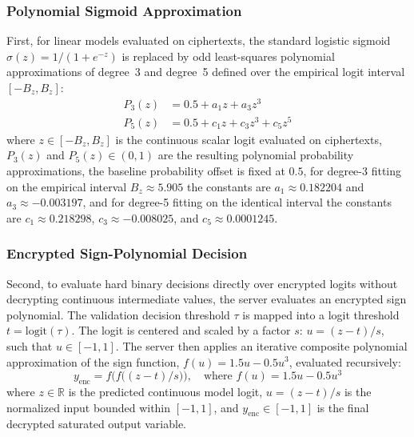 \documentclass[conference]{IEEEtran}
\begin{document}
\subsubsection{Polynomial Sigmoid Approximation}
First, for linear models evaluated on ciphertexts, the standard logistic sigmoid $\sigma(z) = 1/(1 + e^{-z})$ is replaced by odd least-squares polynomial approximations of degree~3 and degree~5 defined over the empirical logit interval $[-B_z, B_z]$:
\begin{equation}
\begin{aligned}
P_3(z) &= 0.5 + a_1 z + a_3 z^3 \\
P_5(z) &= 0.5 + c_1 z + c_3 z^3 + c_5 z^5
\end{aligned}
\label{eq:polysig}
\end{equation}
where $z \in [-B_z, B_z]$ is the continuous scalar logit evaluated on ciphertexts, $P_3(z)$ and $P_5(z) \in (0, 1)$ are the resulting polynomial probability approximations, the baseline probability offset is fixed at $0.5$, for degree-3 fitting on the empirical interval $B_z \approx 5.905$ the constants are $a_1 \approx 0.182204$ and $a_3 \approx -0.003197$, and for degree-5 fitting on the identical interval the constants are $c_1 \approx 0.218298$, $c_3 \approx -0.008025$, and $c_5 \approx 0.0001245$.

\subsubsection{Encrypted Sign-Polynomial Decision}
Second, to evaluate hard binary decisions directly over encrypted logits without decrypting continuous intermediate values, the server evaluates an encrypted sign polynomial. The validation decision threshold $\tau$ is mapped into a logit threshold $t = \mathrm{logit}(\tau)$. The logit is centered and scaled by a factor $s$: $u = (z - t)/s$, such that $u \in [-1, 1]$. The server then applies an iterative composite polynomial approximation of the sign function, $f(u) = 1.5u - 0.5u^3$, evaluated recursively:
\begin{equation}
y_{\mathrm{enc}} = f\bigl(f\bigl((z - t)/s\bigr)\bigr), \quad \text{where } f(u) = 1.5u - 0.5u^3
\label{eq:sign}
\end{equation}
where $z \in \mathbb{R}$ is the predicted continuous model logit, $u = (z - t)/s$ is the normalized input bounded within $[-1, 1]$, and $y_{\mathrm{enc}} \in [-1, 1]$ is the final decrypted saturated output variable.
\end{document}
